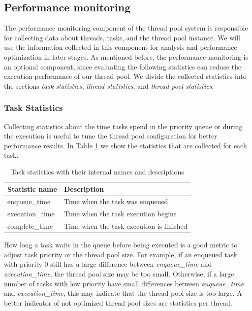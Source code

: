 \documentclass[conference]{IEEEtran}
\begin{document}
\subsection{Performance monitoring}
The performance monitoring component of the thread pool system is responsible for collecting data about threads, tasks, and the thread pool instance. We will use the information collected in this component for analysis and performance optimization in later stages. As mentioned before, the performance monitoring is an optional component, since evaluating the following statistics can reduce the execution performance of our thread pool. We divide the collected statistics into the sections \emph{task statistics}, \emph{thread statistics}, and \emph{thread pool statistics}.

\subsubsection{Task Statistics}
Collecting statistics about the time tasks spend in the priority queue or during the execution is useful to tune the thread pool configuration for better performance results. In Table \ref{tab2} we show the statistics that are collected for each task.

\begin{table}[htbp]
	\caption{Task statistics with their internal names and descriptions}
	\begin{center}
		\begin{tabular}{ l l }
			\hline
			\textbf{Statistic name}&\textbf{Description}\\
			\hline
			enqueue\_time & Time when the task was enqueued \\
			execution\_time & Time when the task execution begins \\
			complete\_time & Time when the task execution is finished \\
			\hline
		\end{tabular}
		\label{tab2}
	\end{center}
\end{table}

How long a task waits in the queue before being executed is a good metric to adjust task priority or the thread pool size. For example, if an enqueued task with priority 0 still has a large difference between \emph{enqueue\_time} and \emph{execution\_time}, the thread pool size may be too small. Otherwise, if a large number of tasks with low priority have small differences between \emph{enqueue\_time} and \emph{execution\_time}, this may indicate that the thread pool size is too large. A better indicator of not optimized thread pool sizes are statistics per thread.
\end{document}
